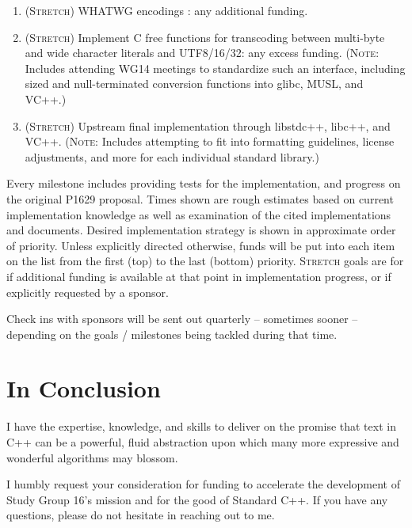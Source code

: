 \documentclass{wg21}
\begin{document}
\begin{enumerate}
	\item (\textsc{Stretch}) WHATWG encodings \cite{whatwg_encoding}: any additional funding.
	\item (\textsc{Stretch}) Implement C free functions for transcoding between multi-byte and wide character literals and UTF8/16/32: any excess funding. (\textsc{Note}: Includes attending WG14 meetings to standardize such an interface, including sized and null-terminated conversion functions into glibc, MUSL, and VC++.)
	\item (\textsc{Stretch}) Upstream final implementation through libstdc++, libc++, and VC++. (\textsc{Note}: Includes attempting to fit into formatting guidelines, license adjustments, and more for each individual standard library.)
\end{enumerate}

Every milestone includes providing tests for the implementation, and progress on the original P1629 proposal. Times shown are rough estimates based on current implementation knowledge as well as examination of the cited implementations and documents. Desired implementation strategy is shown in approximate order of priority. Unless explicitly directed otherwise, funds will be put into each item on the list from the first (top) to the last (bottom) priority. \textsc{Stretch} goals are for if additional funding is available at that point in implementation progress, or if explicitly requested by a sponsor.

Check ins with sponsors will be sent out quarterly -- sometimes sooner -- depending on the goals / milestones being tackled during that time.


\section{In Conclusion}

I have the expertise, knowledge, and skills to deliver on the promise that text in C++ can be a powerful, fluid abstraction upon which many more expressive and wonderful algorithms may blossom.

I humbly request your consideration for funding to accelerate the development of Study Group 16's mission and for the good of Standard C++. If you have any questions, please do not hesitate in reaching out to me.



\end{document}
